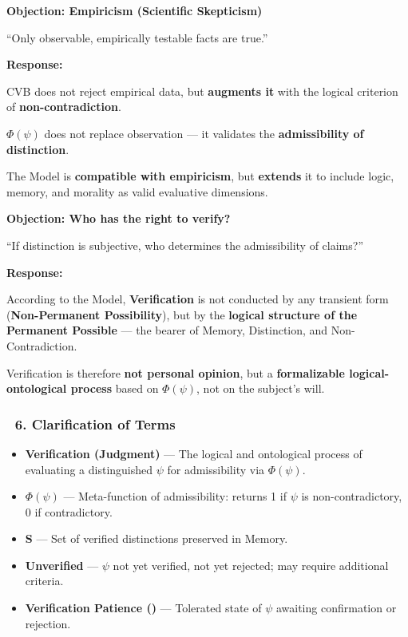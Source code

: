\documentclass[12pt]{article}
\begin{document}
\textbf{Objection: Empiricism (Scientific Skepticism)}

``Only observable, empirically testable facts are true.''

\textbf{Response:}

CVB does not reject empirical data, but \textbf{augments it} with the logical criterion of \textbf{non-contradiction}.

$\Phi(\psi)$ does not replace observation — it validates the \textbf{admissibility of distinction}.

The Model is \textbf{compatible with empiricism}, but \textbf{extends} it to include logic, memory, and morality as valid evaluative dimensions.

\bigskip

\textbf{Objection: Who has the right to verify?}

``If distinction is subjective, who determines the admissibility of claims?''

\textbf{Response:}

According to the Model, \textbf{Verification} is not conducted by any transient form (\textbf{Non-Permanent Possibility}), but by the \textbf{logical structure of the Permanent Possible} — the bearer of Memory, Distinction, and Non-Contradiction.

Verification is therefore \textbf{not personal opinion}, but a \textbf{formalizable logical-ontological process} based on $\Phi(\psi)$, not on the subject’s will.

\subsubsection*{🔹 6. Clarification of Terms}

\begin{itemize}
\item \textbf{Verification (Judgment)} — The logical and ontological process of evaluating a distinguished $\psi$ for admissibility via $\Phi(\psi)$.
\item \textbf{$\Phi(\psi)$} — Meta-function of admissibility: returns 1 if $\psi$ is non-contradictory, 0 if contradictory.
\item \textbf{S} — Set of verified distinctions preserved in Memory.
\item \textbf{Unverified} — $\psi$ not yet verified, not yet rejected; may require additional criteria.
\item \textbf{Verification Patience (\text{[11.8]})} — Tolerated state of $\psi$ awaiting confirmation or rejection.
\end{itemize}
\end{document}
